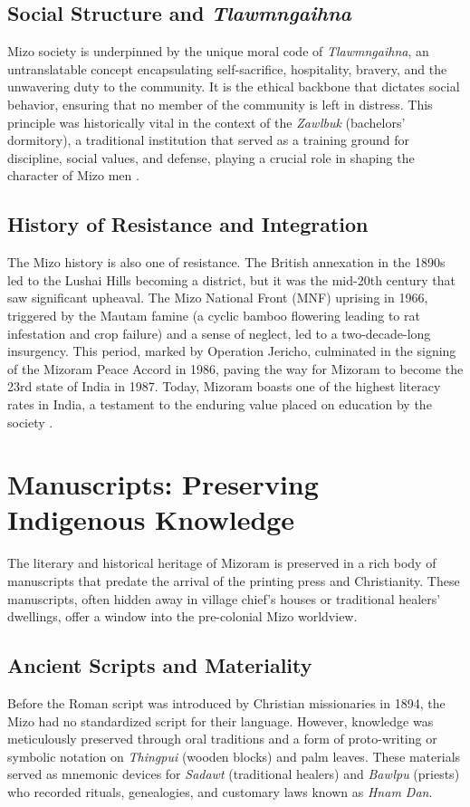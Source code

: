 \documentclass[12pt]{article}
\begin{document}
\subsection{Social Structure and \textit{Tlawmngaihna}}
Mizo society is underpinned by the unique moral code of \textit{Tlawmngaihna}, an untranslatable concept encapsulating self-sacrifice, hospitality, bravery, and the unwavering duty to the community. It is the ethical backbone that dictates social behavior, ensuring that no member of the community is left in distress. This principle was historically vital in the context of the \textit{Zawlbuk} (bachelors' dormitory), a traditional institution that served as a training ground for discipline, social values, and defense, playing a crucial role in shaping the character of Mizo men \cite{mccall1949lushai}.

\subsection{History of Resistance and Integration}
The Mizo history is also one of resistance. The British annexation in the 1890s led to the Lushai Hills becoming a district, but it was the mid-20th century that saw significant upheaval. The Mizo National Front (MNF) uprising in 1966, triggered by the Mautam famine (a cyclic bamboo flowering leading to rat infestation and crop failure) and a sense of neglect, led to a two-decade-long insurgency. This period, marked by Operation Jericho, culminated in the signing of the Mizoram Peace Accord in 1986, paving the way for Mizoram to become the 23rd state of India in 1987. Today, Mizoram boasts one of the highest literacy rates in India, a testament to the enduring value placed on education by the society \cite{nunthara1996mizo}.

\newpage

\section{Manuscripts: Preserving Indigenous Knowledge}
The literary and historical heritage of Mizoram is preserved in a rich body of manuscripts that predate the arrival of the printing press and Christianity. These manuscripts, often hidden away in village chief's houses or traditional healers' dwellings, offer a window into the pre-colonial Mizo worldview.

\subsection{Ancient Scripts and Materiality}
Before the Roman script was introduced by Christian missionaries in 1894, the Mizo had no standardized script for their language. However, knowledge was meticulously preserved through oral traditions and a form of proto-writing or symbolic notation on \textit{Thingpui} (wooden blocks) and palm leaves. These materials served as mnemonic devices for \textit{Sadawt} (traditional healers) and \textit{Bawlpu} (priests) who recorded rituals, genealogies, and customary laws known as \textit{Hnam Dan}.
\end{document}
